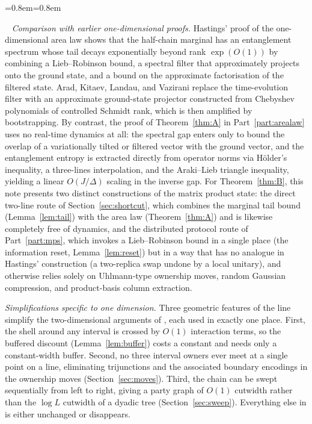 \documentclass[aps,prx,reprint,superscriptaddress,floatfix,nofootinbib,longbibliography,amsmath,amssymb]{revtex4-2}
\theoremstyle{plain}
\theoremstyle{definition}
\newenvironment{inwords}{%
  \par\medskip\noindent
  \begin{list}{}{\leftmargin=0.8em\rightmargin=0.8em}
  \item\relax
  \noindent{\sffamily\bfseries\color{blue!40!black}In words.}\ \sffamily\small}{%
  \end{list}\par\medskip}
\begin{document}
\begin{inwords}
\emph{Comparison with earlier one-dimensional proofs.} Hastings' proof of the
one-dimensional area law \cite{Hastings2007} shows that the half-chain
marginal has an entanglement spectrum whose tail decays exponentially beyond
rank $\exp(O(1))$ by combining a Lieb--Robinson bound, a spectral filter
that approximately projects onto the ground state, and a bound on the
approximate factorisation of the filtered state. Arad, Kitaev, Landau, and Vazirani
\cite{AKLV} replace the time-evolution filter with an approximate
ground-state projector constructed from Chebyshev polynomials of controlled
Schmidt rank, which is then amplified by bootstrapping. By contrast, the
proof of Theorem~\ref{thm:A} in Part~\ref{part:arealaw} uses no real-time
dynamics at all: the spectral gap enters only to bound the overlap of a
variationally tilted or filtered vector with the ground vector, and the entanglement
entropy is extracted directly from operator norms via Hölder's inequality, a
three-lines interpolation, and the Araki--Lieb triangle
inequality, yielding a linear $O(J/\Delta)$ scaling in the inverse gap. For
Theorem~\ref{thm:B}, this note presents two distinct constructions of the
matrix product state: the direct two-line route of Section~\ref{sec:shortcut},
which combines the marginal tail bound (Lemma~\ref{lem:tail}) with the area
law (Theorem~\ref{thm:A}) and is likewise completely free of dynamics, and
the distributed protocol route of Part~\ref{part:mps}, which invokes a
Lieb--Robinson bound in a single place (the information reset,
Lemma~\ref{lem:reset}) but in a way that has no analogue in Hastings'
construction (a two-replica swap undone by a local unitary), and otherwise
relies solely on Uhlmann-type ownership moves, random Gaussian compression,
and product-basis column extraction.

\emph{Simplifications specific to one dimension.} Three geometric features of
the line simplify the two-dimensional arguments of \cite{AL,PP}, each used in
exactly one place. First, the shell around any interval is crossed by $O(1)$
interaction terms, so the buffered discount (Lemma~\ref{lem:buffer}) costs
a constant and needs only a constant-width buffer. Second, no three interval owners ever meet at a single point on
a line, eliminating trijunctions and the associated boundary encodings in the
ownership moves (Section~\ref{sec:moves}). Third, the chain can be swept
sequentially from left to right, giving a party graph of $O(1)$ cutwidth
rather than the $\log L$ cutwidth of a dyadic tree (Section~\ref{sec:sweep}).
Everything else in \cite{AL,PP} is either unchanged or disappears.


\end{inwords}
\end{document}
